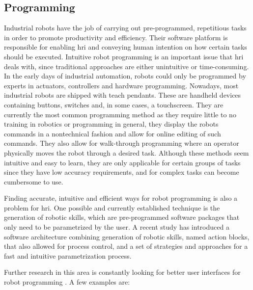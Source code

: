 \subsection{Programming}

\par Industrial robots have the job of carrying out pre-programmed, repetitious tasks in order to promote productivity and efficiency. Their software platform is responsible for enabling \ac{hri} and conveying human intention on how certain tasks should be executed. Intuitive robot programming is an important issue that \ac{hri} deals with, since traditional approaches are either unintuitive or time-consuming. In the early days of industrial automation, robots could only be programmed by experts in actuators, controllers and hardware programming. Nowadays, most industrial robots are shipped with teach pendants. These are handheld devices containing buttons, switches and, in some cases, a touchscreen. They are currently the most common programming method as they require little to no training in robotics or programming in general, they display the robots commands in a nontechnical fashion and allow for online editing of such commands. They also allow for walk-through programming where an operator physically moves the robot through a desired task. Although these methods seem intuitive and easy to learn, they are only applicable for certain groups of tasks since they have low accuracy requirements, and for complex tasks can become cumbersome to use.

\par Finding accurate, intuitive and efficient ways for robot programming is also a problem for \ac{hri}. One possible and currently established technique is the generation of robotic skills, which are pre-programmed software packages that only need to be parametrized by the user. A recent study \cite{cobot.skill} has introduced a software architecture combining generation of robotic skills, named action blocks, that also allowed for process control, and a set of strategies and approaches for a fast and intuitive parametrization process.

\par Further research in this area is constantly looking for better user interfaces for robot programming \cite{paper.review.1, cobot.reality}. A few examples are:

